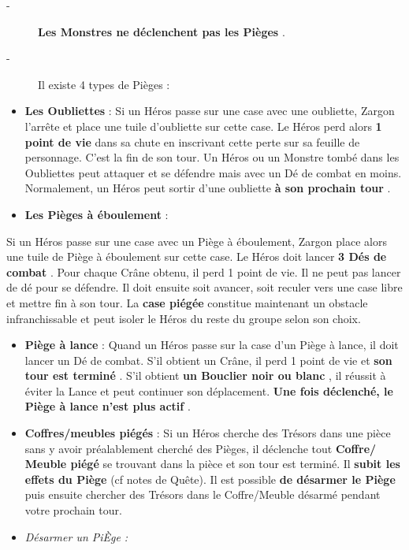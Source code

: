 \documentclass{scrartcl}%
\begin{document}
\begin{description}%
\item[{-} ]%
%
\textcolor{mygreen}{%
\textbf{Les Monstres ne déclenchent pas les Pièges}%
}%
.
%
\item[{-} ]%
%
 Il existe 4 types de Pièges :
%
\end{description}%
\begin{itemize}%
\item%
%
\textcolor{mygreen}{%
\textbf{Les Oubliettes}%
}%
\textit{ }%
 : Si un Héros passe sur une case avec une oubliette, Zargon l'arrête et place une tuile d'oubliette sur cette case. Le Héros perd alors %
\textcolor{mygreen}{%
\textbf{1 point de vie}%
}%
\textit{ }%
 dans sa chute en inscrivant cette perte sur sa feuille de personnage. C'est la fin de son tour. Un Héros ou un Monstre tombé dans les Oubliettes peut attaquer et se défendre mais avec un Dé de combat en moins. Normalement, un Héros peut sortir d'une oubliette%
\textcolor{mygreen}{%
\textbf{ à son prochain tour}%
}%
.
%
\item%
%
\textcolor{mygreen}{%
\textbf{Les Pièges à éboulement}%
}%
\textit{ }%
 :
%
\end{itemize}%
Si un Héros passe sur une case avec un Piège à éboulement, Zargon place alors une tuile de Piège à éboulement sur cette case. Le Héros doit lancer %
\textcolor{mygreen}{%
\textbf{3 Dés de combat}%
}%
. Pour chaque Crâne obtenu, il perd 1 point de vie. Il ne peut pas lancer de dé pour se défendre. Il doit ensuite soit avancer, soit reculer vers une case libre et mettre fin à son tour. La %
\textcolor{mygreen}{%
\textbf{case piégée}%
}%
\textit{ }%
 constitue maintenant un obstacle infranchissable et peut isoler le Héros du reste du groupe selon son choix.
%
\begin{itemize}%
\item%
%
\textcolor{mygreen}{%
\textbf{Piège à lance}%
}%
: Quand un Héros passe sur la case d'un Piège à lance, il doit lancer un Dé de combat. S'il obtient un Crâne, il perd 1 point de vie et %
\textcolor{mygreen}{%
\textbf{son tour est terminé}%
}%
. S'il obtient %
\textcolor{mygreen}{%
\textbf{un Bouclier noir ou blanc}%
}%
, il réussit à éviter la Lance et peut continuer son déplacement.%
\textcolor{mygreen}{%
\textbf{ Une fois déclenché, le Piège à lance n'est plus actif}%
}%
.
%
\item%
%
\textcolor{mygreen}{%
\textbf{Coffres/meubles piégés}%
}%
: Si un Héros cherche des Trésors dans une pièce sans y avoir préalablement cherché des Pièges, il déclenche tout %
\textcolor{mygreen}{%
\textbf{Coffre/ Meuble piégé}%
}%
\textit{ }%
 se trouvant dans la pièce et son tour est terminé. Il %
\textcolor{mygreen}{%
\textbf{subit les effets du Piège }%
}%
(cf notes de Quête). Il est possible %
\textcolor{mygreen}{%
\textbf{de désarmer le Piège}%
}%
\textit{ }%
 puis ensuite chercher des Trésors dans le Coffre/Meuble désarmé pendant votre prochain tour.
%
\item%
%
\textit{Désarmer un PiÈge}%
\textit{:
}%
\end{itemize}%
\end{document}

